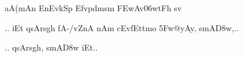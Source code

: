 \dnnemslokad 
{\dn aA(mAn\2 EnEv\0kSp\2 Efvpdmsm\2 \3FEwAv\306wtFh sv\?{\qvb} \vegdn\dontdisplaylinenum}


\dnvers

{\dn 
\jump
\begin{center}
{..} iEt qsArs\2g\5h\? fA-/vZ\0nA nAm cEv{\rdt}fEttmo \35Fw@yAy, smA\3D8w,{..}
\end{center}\vers}

{\dn 
\jump
\begin{center}
{..} qsArs\2g\5h, smA\3D8w iEt{..}
\end{center}\vers}
